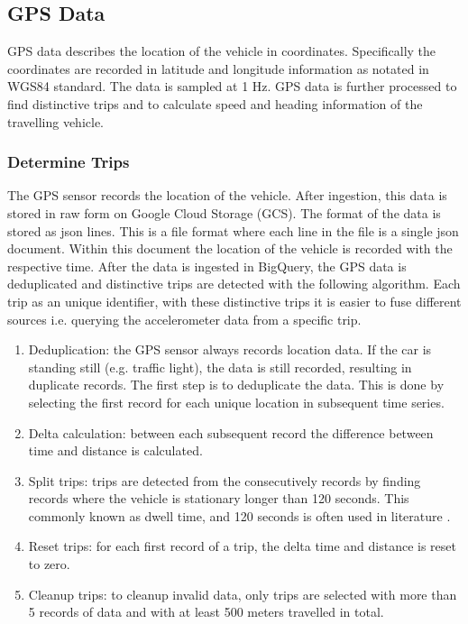 \subsection{GPS Data}
GPS data describes the location of the vehicle in coordinates. Specifically the coordinates are recorded in latitude and longitude information as notated in WGS84 standard. The data is sampled at 1 Hz. GPS data is further processed to find distinctive trips and to calculate speed and heading information of  the travelling vehicle.


\subsubsection{Determine Trips}
The GPS sensor records the location of the vehicle. After ingestion, this data is stored in raw form on Google Cloud Storage (GCS). The format of the data is stored as json lines. This is a file format where each line in the file is a single json document. Within this document the location of the vehicle is recorded with the respective time. After the data is ingested in BigQuery, the GPS data is deduplicated and distinctive trips are detected with the following algorithm. Each trip as an unique identifier, with these distinctive trips it is easier to fuse different sources i.e. querying the accelerometer data from a specific trip.

\begin{enumerate}
\item Deduplication: the GPS sensor always records location data. If the car is standing still (e.g. traffic light), the data is still recorded, resulting in duplicate records. The first step is to deduplicate the data. This is done by selecting the first record for each unique location in subsequent time series. 
\item Delta calculation: between each subsequent record the difference between time and distance is calculated.
\item Split trips: trips are detected from the consecutively records by finding records where the vehicle is stationary longer than 120 seconds. This commonly known as dwell time, and 120 seconds is often used in literature \cite{Wolf2001}.
\item Reset trips: for each first record of a trip, the delta time and distance is reset to zero.
\item Cleanup trips: to cleanup invalid data, only trips are selected with more than 5 records of data and with at least 500 meters travelled in total.
\end{enumerate}


